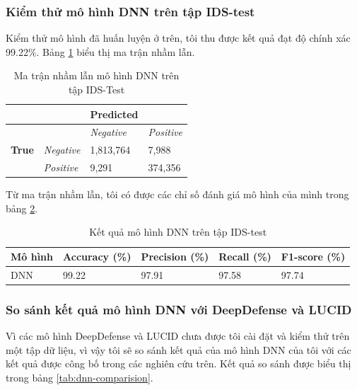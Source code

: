 \subsubsection{Kiểm thử mô hình DNN trên tập IDS-test}

Kiểm thử mô hình đã huấn luyện ở trên, tôi thu được kết quả đạt độ chính xác 99.22\%. Bảng \ref{tab:dnn-confusion-matrix} biểu thị ma trận nhầm lẫn.

\begin{table}[ht!]
	\centering
	\begin{tabular}{|l|l|l|l|}
		\hline
		&                   & \textbf{Predicted} &                   \\ \hline
		&                   & \textit{Negative}  & \textit{Positive} \\ \hline
		\textbf{True} & \textit{Negative} & 1,813,764          & 7,988             \\ \hline
		& \textit{Positive} & 9,291              & 374,356           \\ \hline
	\end{tabular}
\caption{Ma trận nhầm lẫn mô hình DNN trên tập IDS-Test}
\label{tab:dnn-confusion-matrix}
\end{table}

Từ ma trận nhầm lẫn, tôi có được các chỉ số đánh giá mô hình của mình trong bảng \ref{tab:dnn-result}.

\begin{table}[ht!]
	\centering
	\begin{tabular}{|l|l|l|l|l|}
		\hline
		\multicolumn{1}{|c|}{\textbf{Mô hình}} &
		\multicolumn{1}{c|}{\textbf{Accuracy (\%)}} &
		\multicolumn{1}{c|}{\textbf{Precision (\%)}} &
		\multicolumn{1}{c|}{\textbf{Recall (\%)}} &
		\multicolumn{1}{c|}{\textbf{F1-score (\%)}} \\ \hline
		DNN &
		99.22 &
		97.91 &
		97.58 &
		97.74 \\ \hline
	\end{tabular}
\caption{Kết quả mô hình DNN trên tập IDS-test}
\label{tab:dnn-result}
\end{table}

\subsubsection{So sánh kết quả mô hình DNN với DeepDefense và LUCID}

Vì các mô hình DeepDefense \cite{28-Yuan} và LUCID \cite{27-Corin} chưa được tôi cài đặt và kiểm thử trên một tập dữ liệu, vì vậy tôi sẽ so sánh kết quả của mô hình DNN của tôi với các kết quả được công bố trong các nghiên cứu trên. Kết quả so sánh được biểu thị trong bảng \ref{tab:dnn-comparision}.

